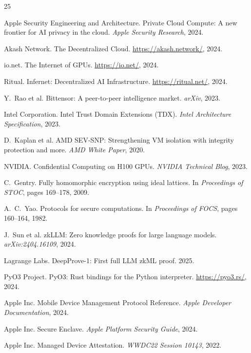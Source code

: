 \documentclass[10pt,twocolumn,letterpaper]{article}
\begin{document}

\begin{thebibliography}{25}

Apple Security Engineering and Architecture.
Private Cloud Compute: A new frontier for AI privacy in the cloud.
\emph{Apple Security Research}, 2024.

Akash Network. The Decentralized Cloud. \url{https://akash.network/}, 2024.

io.net. The Internet of GPUs. \url{https://io.net/}, 2024.

Ritual. Infernet: Decentralized AI Infrastructure. \url{https://ritual.net/}, 2024.

Y.~Rao et al. Bittensor: A peer-to-peer intelligence market. \emph{arXiv}, 2023.

Intel Corporation. Intel Trust Domain Extensions (TDX). \emph{Intel Architecture Specification}, 2023.

D.~Kaplan et al. AMD SEV-SNP: Strengthening VM isolation with integrity protection and more. \emph{AMD White Paper}, 2020.

NVIDIA. Confidential Computing on H100 GPUs. \emph{NVIDIA Technical Blog}, 2023.

C.~Gentry. Fully homomorphic encryption using ideal lattices. In \emph{Proceedings of STOC}, pages 169--178, 2009.

A.~C.~Yao. Protocols for secure computations. In \emph{Proceedings of FOCS}, pages 160--164, 1982.

J.~Sun et al. zkLLM: Zero knowledge proofs for large language models. \emph{arXiv:2404.16109}, 2024.

Lagrange Labs. DeepProve-1: First full LLM zkML proof. 2025.

PyO3 Project. PyO3: Rust bindings for the Python interpreter. \url{https://pyo3.rs/}, 2024.

Apple Inc. Mobile Device Management Protocol Reference. \emph{Apple Developer Documentation}, 2024.

Apple Inc. Secure Enclave. \emph{Apple Platform Security Guide}, 2024.

Apple Inc. Managed Device Attestation. \emph{WWDC22 Session 10143}, 2022.


\end{thebibliography}
\end{document}

